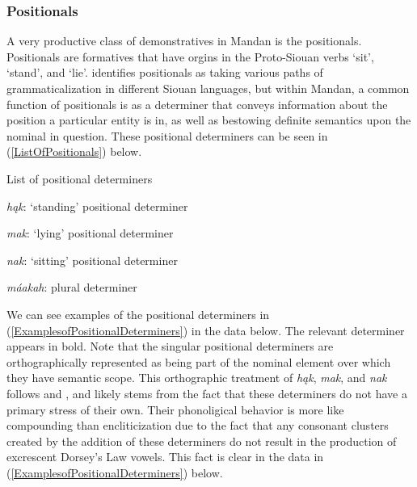 \subsubsection{Positionals}\label{SubSubSecPositionals}

A very productive class of demonstratives in Mandan is the positionals. Positionals are  formatives that have orgins in the Proto-Siouan verbs `sit', `stand', and `lie'. \citet{rankin1977,rankin2004} identifies positionals as taking various paths of grammaticalization in different Siouan languages, but within Mandan, a common function of positionals is as a determiner that conveys information about the position a particular entity is in, as well as bestowing definite semantics upon the nominal in question. These positional determiners can be seen in (\ref{ListOfPositionals}) below.

\begin{exe}
    \item\label{ListOfPositionals} List of positional determiners

    \begin{xlist}
        \item\label{ListOfPositionalsA} \textit{hąk}: `standing' positional determiner
        \item\label{ListOfPositionalsB} \textit{mak}: `lying' positional determiner
        \item\label{ListOfPositionalsC} \textit{nak}: `sitting' positional determiner
        \item\label{ListOfPositionalsD} \textit{máakah}: plural determiner
    \end{xlist}
\end{exe}

We can see examples of the positional determiners in (\ref{ExamplesofPositionalDeterminers}) in the data below. The relevant determiner appears in bold. Note that the singular positional determiners are orthographically represented as being part of the nominal element over which they have semantic scope. This orthographic treatment of \textit{hąk}, \textit{mak}, and \textit{nak} follows \citet{hollow1970,hollow1973a,hollow1973b} and \citet{hollow1976}, and likely stems from the fact that these determiners do not have a primary stress of their own. Their phonoligical behavior is more like compounding than encliticization due to the fact that any consonant clusters created by the addition of these determiners do not result in the production of excrescent Dorsey's Law vowels. This fact is clear in the data in (\ref{ExamplesofPositionalDeterminers}) below.

